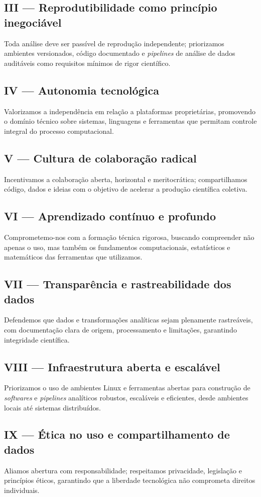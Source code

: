 \documentclass[
  12pt,          %
  a4paper,       %
  oneside,       %
  brazil         %
]{article}
\newenvironment{principio}[1]{%
  \vspace{0.8em}
  \noindent
  \begin{minipage}{\textwidth}
    \subsection*{#1}
    \itshape
}{%
  \end{minipage}
  \vspace{0.5em}
}
\begin{document}
\begin{principio}{III --- Reprodutibilidade como princípio inegociável}
Toda análise deve ser passível de reprodução independente; priorizamos ambientes versionados, código documentado e \textit{pipelines} de análise de dados auditáveis
 como requisitos mínimos de rigor científico.
\end{principio}

\begin{principio}{IV --- Autonomia tecnológica}
Valorizamos a independência em relação a plataformas proprietárias, promovendo o domínio técnico sobre sistemas, linguagens e ferramentas que 
permitam controle integral do processo computacional.
\end{principio}

\begin{principio}{V --- Cultura de colaboração radical}
Incentivamos a colaboração aberta, horizontal e meritocrática; compartilhamos código, dados e ideias com o objetivo de acelerar a produção científica coletiva.
\end{principio}

\begin{principio}{VI --- Aprendizado contínuo e profundo}
Comprometemo-nos com a formação técnica rigorosa, buscando compreender não apenas o uso, mas também os fundamentos computacionais, 
estatísticos e matemáticos das ferramentas que utilizamos.
\end{principio}

\begin{principio}{VII --- Transparência e rastreabilidade dos dados}
Defendemos que dados e transformações analíticas sejam plenamente rastreáveis, com documentação clara de origem, processamento e limitações, 
garantindo integridade científica.
\end{principio}

\begin{principio}{VIII --- Infraestrutura aberta e escalável}
Priorizamos o uso de ambientes Linux e ferramentas abertas para construção de \textit{softwares} e \textit{pipelines} analíticos robustos, escaláveis e eficientes, 
desde ambientes locais até sistemas distribuídos.
\end{principio}

\begin{principio}{IX --- Ética no uso e compartilhamento de dados}
Aliamos abertura com responsabilidade; respeitamos privacidade, legislação e princípios éticos, garantindo que a liberdade tecnológica não 
comprometa direitos individuais.
\end{principio}
\end{document}
